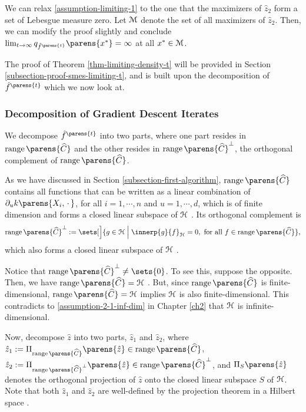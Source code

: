 \begin{remark}
	We can relax \ref{assumption-limiting-1} to the one that the maximizers of $\hat{z}_2$ form a set of Lebesgue measure zero. Let $\mathcal{M}$ denote the set of all maximizers of $\hat{z}_2$. Then, we can modify the proof slightly and conclude $\lim_{t \to \infty} q_{\hat{f}^{\parens{t}}} \parens{x^*} = \infty$ at all $x^* \in \mathcal{M}$. 
\end{remark}

The proof of Theorem \ref{thm-limiting-density-t} will be provided in Section \ref{subsection-proof-smes-limiting-t}, and is built upon the decomposition of $\hat{f}^{\parens{t}}$ which we now look at. 

\subsubsection{Decomposition of Gradient Descent Iterates}

We decompose $\hat{f}^{\parens{t}}$ into two parts, where one part resides in $\range \parens{\widehat{C}}$ and the other resides in $\range \parens{\widehat{C}}^{\perp}$, the orthogonal complement of $\range \parens{\widehat{C}}$. 

As we have discussed in Section \ref{subsection-first-algorithm}, $\range \parens{\widehat{C}}$ contains all functions that can be written as a linear combination of $\partial_u k \parens{X_i, \,\cdot\,}$, for all $i = 1, \cdots, n$ and $u = 1, \cdots, d$, which is of finite dimension and forms a closed linear subspace of $\mathcal{H}$ \parencite[Corollary 6 in Section 13.3 in][]{Royden2018-cd}. Its orthogonal complement is 
\begin{align*}
	\range \parens{\widehat{C}}^{\perp} := \sets[\Big]{g \in \calH \Bigm| \innerp{g}{f}_{\calH} = 0, \text{ for all } f \in \range \parens{\widehat{C}}}, 
\end{align*}
which also forms a closed linear subspace of $\mathcal{H}$ \parencite[Section 16.1 in][]{Royden2018-cd}.  

Notice that $\range \parens{\widehat{C}}^{\perp} \neq \sets{0}$. To see this, suppose the opposite. Then, we have $\range \parens{\widehat{C}} = \calH$ \parencite[Corollary 4 in Section 16.1 in][]{Royden2018-cd}. But, since $\range \parens{\widehat{C}}$ is finite-dimensional, $\range \parens{\widehat{C}} = \calH$ implies $\mathcal{H}$ is also finite-dimensional. This contradicts to \ref{assumption-2-1-inf-dim} in Chapter \ref{ch2} that $\mathcal{H}$ is infinite-dimensional. 

Now, decompose $\hat{z}$ into two parts, $\hat{z}_1$ and $\hat{z}_2$, where $\hat{z}_1 := \Pi_{\range \parens{\widehat{C}}} \parens{\hat{z}} \in \range \parens{\widehat{C}}$, $\hat{z}_2 := \Pi_{\range \parens{\widehat{C}}^{\perp}} \parens{\hat{z}} \in \range \parens{\widehat{C}}^{\perp}$, and $\Pi_S \parens{\hat{z}}$ denotes the orthogonal projection of $\hat{z}$ onto the closed linear subspace $S$ of $\mathcal{H}$. Note that both $\hat{z}_1$ and $\hat{z}_2$ are well-defined by the projection theorem in a Hilbert space \parencite[Theorem 2.3.1 in][]{Brockwell2013-dq}. 

